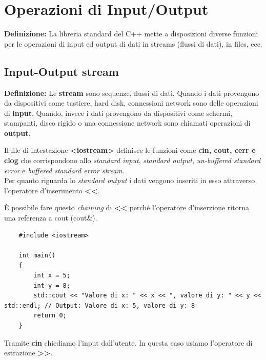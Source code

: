 
\newpage

\section{Operazioni di Input/Output}

\textsf{\small \textbf{Definizione: } La libreria standard del C++ mette a disposizioni diverse funzioni per le operazioni di input ed output di dati in streams (flussi di dati), in files, ecc.} \\

\subsection{Input-Output stream}

\textsf{\small \textbf{Definizione: } Le \textbf{stream} sono sequenze, flussi di dati. Quando i dati provengono da dispositivi come tastiere, hard disk, connessioni network sono delle operazioni di \textbf{input}. Quando, invece i dati provengono da dispositivi come schermi, stampanti, disco rigido o una connessione network sono chiamati operazioni di \textbf{output}.} \break

\textsf{\small Il file di intestazione \textbf{<iostream>} definisce le funzioni come \textbf{cin, cout, cerr e clog} che corrispondono allo \emph{standard input}, \emph{standard output}, \emph{un-buffered standard error} e \emph{buffered standard error stream}.} \\

\textsf{\small Per quanto riguarda lo \emph{standard output} i dati vengono inseriti in esso attraverso l'operatore d'inserimento \textbf{<<}.} \break

\textsf{\small È possibile fare questo \emph{chaining} di \textbf{<<} perché l'operatore d'inserzione ritorna una referenza a cout (cout\&).} \\

\begin{lstlisting}
	#include <iostream>
	
	int main()
	{
		int x = 5;
		int y = 8;
		std::cout << "Valore di x: " << x << ", valore di y: " << y << std::endl; // Output: Valore di x: 5, valore di y: 8
		return 0;
	}
\end{lstlisting}

\textsf{\small Tramite \textbf{cin} chiediamo l'input dall'utente. In questa caso usiamo l'operatore di estrazione \textbf{>>}.} \\

